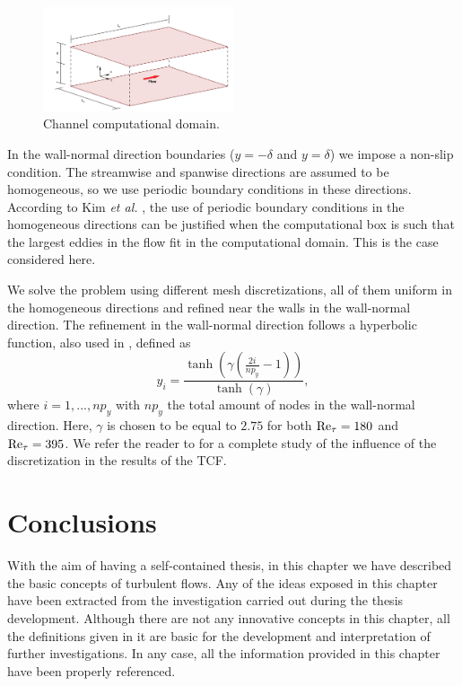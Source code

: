 \begin{figure}[h!]
	\centering	
	\includegraphics[width=0.5\textwidth]{Figures/Chapter3/channel_geom}
	\caption{Channel computational domain.}
	\label{fig:Channel_geo}
\end{figure}

In the wall-normal direction boundaries ($y=-\delta$ and $y=\delta$) we impose a non-slip condition. The streamwise and spanwise directions are assumed to be homogeneous, so we use periodic boundary conditions in these directions. According to Kim  \emph{et al.} \cite{kim_turbulence_1987}, the use of periodic boundary conditions in the homogeneous directions can be justified when the computational box is such that the largest eddies in the flow fit in the computational domain. This is the case considered here.

We solve the problem using different mesh discretizations, all of them uniform in the homogeneous directions and refined near the walls in the wall-normal direction. The refinement in the wall-normal direction follows a hyperbolic function, also used in \cite{calderer_residual-based_2013,  gamnitzer_time-dependent_2010,  gravemeier_algebraic_2010, gullbrand_effect_2003, masud_variational_2011}, defined as 
$$y_i=\frac{\tanh\left(\gamma\left(\frac{2i}{np_y}-1\right)\right)}{\tanh(\gamma)},$$
where $i=1,...,np_y$ with $np_y$ the total amount of nodes in the wall-normal direction. Here, $\gamma$ is  chosen to be equal to $2.75$ for both  ${\rm Re}_\tau=180$ and ${\rm Re}_\tau=395$.  We refer the reader to \cite{avila_large_2014} for a complete study of the influence of the discretization in the results of the TCF.

\section{Conclusions}
\label{sec-C3_conclusions}
With the aim of having a self-contained thesis, in this chapter we have described the basic concepts of turbulent flows. Any of the ideas exposed in this chapter have been extracted from the investigation carried out during the thesis development. Although there are not any innovative concepts in this chapter, all the definitions given in it are basic for the development and interpretation of further investigations. In any case, all the information provided in this chapter have been properly referenced.

